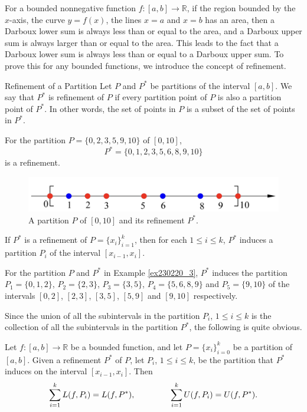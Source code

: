 For a  bounded nonnegative   function $f:[a,b]\to \mathbb{R}$,  if the region bounded by the $x$-axis, the curve $y=f(x)$, the lines $x=a$ and $x=b$ has an area, then a Darboux lower sum  is always less than or  equal to the area, and a Darboux upper sum   is always larger than or equal to the area. This leads to the fact that a Darboux lower sum is always less than or equal to a Darboux upper sum. To prove this for any bounded functions, we introduce the concept of refinement.

\begin{definition}{Refinement of a Partition}
Let $P$ and $P^*$ be partitions of the interval $[a,b]$. We say that $P^*$ is refinement of $P$ if every partition point of $P$ is also a partition point of $P^*$. In other words, the set of points in $P$ is a subset of the set of points in $P^*$.
\end{definition}

 \begin{example}[label=ex230220_3]{}
For the partition $P=\{0, 2, 3, 5, 9, 10\}$ of $[0,10]$, \[P^*=\{0, 1, 2, 3, 5, 6, 8, 9, 10\}\] is a refinement.
\end{example}
 \begin{figure}[ht]
\centering
\includegraphics[scale=0.2]{Picture39.png}
\caption{A partition $P$ of $[0,10]$ and its refinement $P^*$.\fa}\label{figure39}
\end{figure}

If $P^*$ is a refinement of $P=\{x_i\}_{i=1}^k$, then for each $1\leq i\leq k$, $P^*$ induces a partition $P_i$ of the interval $[x_{i-1}, x_i]$. 

 \begin{example}[label=ex230220_4]{}
For the partition $P$ and $P^*$ in Example \ref{ex230220_3}, $P^*$ induces the partition $P_1=\{0,1,2\}$, $P_2=\{2,3\}$, $P_3=\{3,5\}$, $P_4=\{5,6,8,9\}$ and $P_5=\{9,10\}$ of the intervals $[0,2]$, $[2,3]$,  $[3,5]$, $[5,9]$ and $[9,10]$ respectively. 
\end{example}

Since the union of all the subintervals in the partition $P_i$, $1\leq i\leq k$ is the collection of all the subintervals in the partition $P^*$, the following is quite obvious.
\begin{proposition}[label=230220_5]{}
Let $f:[a,b]\to\mathbb{R}$ be a bounded function, and let $P=\{x_i\}_{i=0}^k$ be a partition of $[a,b]$. Given a refinement $P^*$ of $P$,  let $P_i$, $1\leq i\leq k$, be the partition that $P^*$ induces on the interval $[x_{i-1}, x_i]$. Then
\[\sum_{i=1}^kL(f,P_i)=L(f,P^*),\hspace{1.5cm} \sum_{i=1}^kU(f,P_i)=U(f,P^*).\]
\end{proposition}

